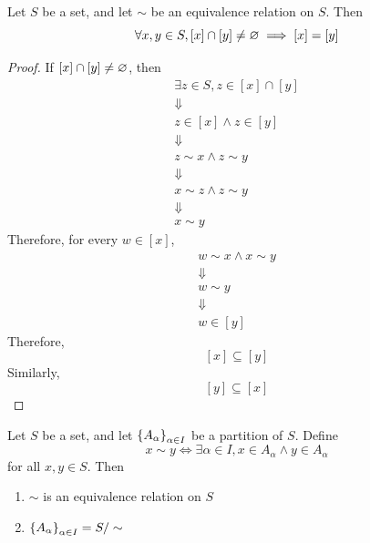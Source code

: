 \bigskip

\begin{theorem} \label{an:thm:equivalence-classes-form-a-partition}
    Let $S$ be a set, and let $\sim$ be an equivalence relation on $S$. Then
    \[
    \forall x, y \in S, [x] \cap [y] \neq \vnot \implies [x] = [y]
    \]
\end{theorem}

\begin{proof}
    If $[x] \cap [y] \neq \vnot$, then
    \[
    \begin{array}{c}
        \exists z \in S, z \in [x] \cap [y] \\
        \Downarrow \\
        z \in [x] \land z \in [y] \\
        \Downarrow \\
        z \sim x \land z \sim y \\
        \Downarrow \\
        x \sim z \land z \sim y \\
        \Downarrow \\
        x \sim y
    \end{array}
    \]
    Therefore, for every $w \in [x]$,
    \[
    \begin{array}{c}
        w \sim x \land x \sim y \\
        \Downarrow \\
        w \sim y \\
        \Downarrow \\
        w \in [y]
    \end{array}
    \]
    Therefore,
    \[
    [x] \subseteq [y]
    \]
    Similarly,
    \[
    [y] \subseteq [x]
    \]
\end{proof}

\bigskip

\begin{theorem} \label{an:thm:partition-defines-equivalence-relation}
    Let $S$ be a set, and let $\set*{A_{\alpha}}_{\alpha \in I}$ be a partition of $S$. Define
    \[
    x \sim y \iff \exists \alpha \in I, x \in A_{\alpha} \land y \in A_{\alpha}
    \]
    for all $x, y \in S$. Then
    \begin{enumerate}[label=\textbf{(\Alph*)}]
        \item $\sim$ is an equivalence relation on $S$
        \item $\set*{A_{\alpha}}_{\alpha \in I} = S / \sim$
    \end{enumerate}
\end{theorem}

